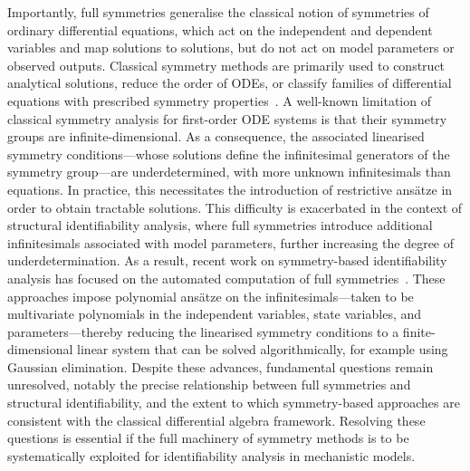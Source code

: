 \documentclass[12pt]{article}
\begin{document}
Importantly, full symmetries generalise the classical notion of symmetries of ordinary differential equations, which act on the independent and dependent variables and map solutions to solutions, but do not act on model parameters or observed outputs. Classical symmetry methods are primarily used to construct analytical solutions, reduce the order of ODEs, or classify families of differential equations with prescribed symmetry properties~\cite{bluman1989symmetries,hydon2000symmetry,olver2000applications,stephani1989differential}. A well-known limitation of classical symmetry analysis for first-order ODE systems is that their symmetry groups are infinite-dimensional. As a consequence, the associated linearised symmetry conditions—whose solutions define the infinitesimal generators of the symmetry group—are underdetermined, with more unknown infinitesimals than equations. In practice, this necessitates the introduction of restrictive ans\"{a}tze in order to obtain tractable solutions. This difficulty is exacerbated in the context of structural identifiability analysis, where full symmetries introduce additional infinitesimals associated with model parameters, further increasing the degree of underdetermination. As a result, recent work on symmetry-based identifiability analysis has focused on the automated computation of full symmetries~\cite{merkt2015higher,massonis2020finding}. These approaches impose polynomial ans\"{a}tze on the infinitesimals—taken to be multivariate polynomials in the independent variables, state variables, and parameters—thereby reducing the linearised symmetry conditions to a finite-dimensional linear system that can be solved algorithmically, for example using Gaussian elimination. Despite these advances, fundamental questions remain unresolved, notably the precise relationship between full symmetries and structural identifiability, and the extent to which symmetry-based approaches are consistent with the classical differential algebra framework. Resolving these questions is essential if the full machinery of symmetry methods is to be systematically exploited for identifiability analysis in mechanistic models.
\end{document}
